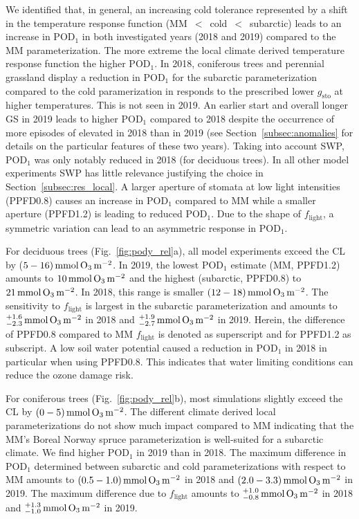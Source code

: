 \documentclass[bg, manuscript]{copernicus}
\begin{document}
We identified that, in general, an increasing cold tolerance represented by a shift in the temperature response function (MM~$<$~cold~$<$~subarctic) leads to an increase in $\mathrm{POD_1}$ in both investigated years (2018 and 2019) compared to the MM parameterization. The more extreme the local climate derived temperature response function the higher $\mathrm{POD_1}$. In 2018, coniferous trees and perennial grassland display a reduction in $\mathrm{POD_1}$ for the subarctic parameterization compared to the cold paramerization in responds to the prescribed lower $g_\mathrm{sto}$ at higher temperatures. This is not seen in 2019. An earlier start and overall longer GS in 2019 leads to higher $\mathrm{POD_1}$ compared to 2018 despite the occurrence of more episodes of elevated  in 2018 than in 2019 (see Section~\ref{subsec:anomalies} for details on the particular features of these two years). Taking into account SWP, $\mathrm{POD_1}$ was only notably reduced in 2018 (for deciduous trees). In all other model experiments SWP has little relevance justifying the choice in Section~\ref{subsec:res_local}. A larger aperture of stomata at low light intensities (PPFD0.8) causes an increase in $\mathrm{POD_1}$ compared to MM while a smaller aperture (PPFD1.2) is leading to reduced $\mathrm{POD_1}$. Due to the shape of $f_\mathrm{light}$, a symmetric variation can lead to an asymmetric response in $\mathrm{POD_1}$.

For deciduous trees (Fig.~\ref{fig:pody_rel}a), all model experiments exceed the CL by ($5-16)\,\unit{mmol\,\chem{O_3}\,m^{-2}}$. In 2019, the lowest $\mathrm{POD_1}$ estimate (MM, PPFD1.2) amounts to $10\,\unit{mmol\,\chem{O_3}\,m^{-2}}$ and the highest (subarctic, PPFD0.8) to $21\,\unit{mmol\,\chem{O_3}\,m^{-2}}$. In 2018, this range is smaller $(12-18)\,\unit{mmol\,\chem{O_3}\,m^{-2}}$. The sensitivity to $f_\mathrm{light}$ is largest in the subarctic parameterization and amounts to $^{+1.6}_{-2.3}\,\unit{mmol\,\chem{O_3}\,m^{-2}}$ in 2018 and $^{+1.9}_{-2.7}\,\unit{mmol\,\chem{O_3}\,m^{-2}}$ in 2019. Herein, the difference of PPFD0.8 compared to MM $f_\mathrm{light}$ is denoted as superscript and for PPFD1.2 as subscript. A low soil water potential caused a reduction in $\mathrm{POD_1}$ in 2018 in particular when using PPFD0.8. This indicates that water limiting conditions can reduce the ozone damage risk.

For coniferous trees (Fig.~\ref{fig:pody_rel}b), most simulations slightly exceed the CL by $(0-5)\,\unit{mmol\,\chem{O_3}\,m^{-2}}$. The different climate derived local parameterizations do not show much impact compared to MM indicating that the MM's Boreal Norway spruce parameterization is well-suited for a subarctic climate. We find higher $\mathrm{POD_1}$ in 2019 than in 2018. The maximum difference in $\mathrm{POD_1}$ determined between subarctic and cold parameterizations with respect to MM amounts to $(0.5-1.0)\,\unit{mmol\,\chem{O_3}\,m^{-2}}$ in 2018 and $(2.0-3.3)\,\unit{mmol\,\chem{O_3}\,m^{-2}}$ in 2019. The maximum difference due to $f_\mathrm{light}$ amounts to $^{+1.0}_{-0.8}\,\unit{mmol\,\chem{O_3}\,m^{-2}}$ in 2018 and $^{+1.3}_{-1.0}\,\unit{mmol\,\chem{O_3}\,m^{-2}}$ in 2019.
\end{document}
